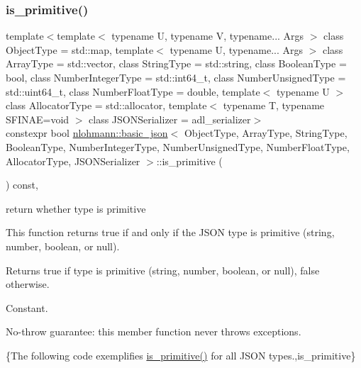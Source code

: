 \subsubsection{\texorpdfstring{is\+\_\+primitive()}{is\_primitive()}}
{\footnotesize\ttfamily template$<$template$<$ typename U, typename V, typename... Args $>$ class Object\+Type = std\+::map, template$<$ typename U, typename... Args $>$ class Array\+Type = std\+::vector, class String\+Type  = std\+::string, class Boolean\+Type  = bool, class Number\+Integer\+Type  = std\+::int64\+\_\+t, class Number\+Unsigned\+Type  = std\+::uint64\+\_\+t, class Number\+Float\+Type  = double, template$<$ typename U $>$ class Allocator\+Type = std\+::allocator, template$<$ typename T, typename S\+F\+I\+N\+A\+E=void $>$ class J\+S\+O\+N\+Serializer = adl\+\_\+serializer$>$ \\
constexpr bool \mbox{\hyperlink{classnlohmann_1_1basic__json}{nlohmann\+::basic\+\_\+json}}$<$ Object\+Type, Array\+Type, String\+Type, Boolean\+Type, Number\+Integer\+Type, Number\+Unsigned\+Type, Number\+Float\+Type, Allocator\+Type, J\+S\+O\+N\+Serializer $>$\+::is\+\_\+primitive (\begin{DoxyParamCaption}{ }\end{DoxyParamCaption}) const\hspace{0.3cm}{\ttfamily [inline]}, {\ttfamily [noexcept]}}



return whether type is primitive 

This function returns true if and only if the J\+S\+ON type is primitive (string, number, boolean, or null).

\begin{DoxyReturn}{Returns}
{\ttfamily true} if type is primitive (string, number, boolean, or null), {\ttfamily false} otherwise.
\end{DoxyReturn}
Constant.

No-\/throw guarantee\+: this member function never throws exceptions.

\{The following code exemplifies {\ttfamily \mbox{\hyperlink{classnlohmann_1_1basic__json_a6362b88718eb5c6d4fed6a61eed44b95}{is\+\_\+primitive()}}} for all J\+S\+ON types.,is\+\_\+primitive\}

